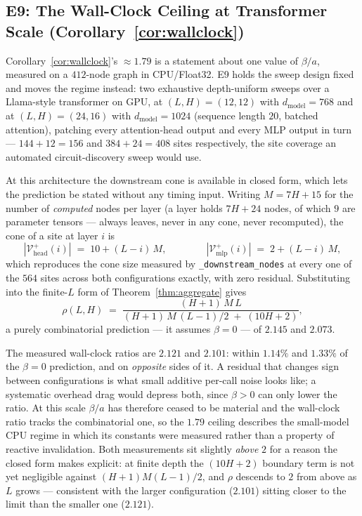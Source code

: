 \documentclass[11pt,a4paper]{article}
\newcommand{\V}{\mathcal{V}}
\begin{document}
\subsection{E9: The Wall-Clock Ceiling at Transformer Scale (Corollary~\ref{cor:wallclock})}
\label{sec:e9}

Corollary~\ref{cor:wallclock}'s $\approx 1.79$ is a statement about one value of $\beta/a$, measured
on a $412$-node graph in CPU\slash Float32. E9 holds the sweep design fixed and moves the regime
instead: two exhaustive depth-uniform sweeps over a Llama-style transformer on GPU, at
$(L,H)=(12,12)$ with $d_{\mathrm{model}}=768$ and at $(L,H)=(24,16)$ with $d_{\mathrm{model}}=1024$
(sequence length $20$, batched attention), patching every attention-head output and every MLP output
in turn --- $144{+}12=156$ and $384{+}24=408$ sites respectively, the site coverage an automated
circuit-discovery sweep would use.

At this architecture the downstream cone is available in closed form, which lets the prediction be
stated without any timing input. Writing $M = 7H+15$ for the number of \emph{computed} nodes per
layer (a layer holds $7H+24$ nodes, of which $9$ are parameter tensors --- always leaves, never in
any cone, never recomputed), the cone of a site at layer $i$ is
\[
|\V^+_{\mathrm{head}}(i)| \;=\; 10 + (L-i)\,M, \qquad\qquad
|\V^+_{\mathrm{mlp}}(i)| \;=\; 2 + (L-i)\,M,
\]
which reproduces the cone size measured by \texttt{\_downstream\_nodes} at every one of the $564$
sites across both configurations exactly, with zero residual. Substituting into the finite-$L$ form
of Theorem~\ref{thm:aggregate} gives
\[
\rho(L,H) \;=\; \frac{(H{+}1)\,M\,L}{(H{+}1)\,M\,(L{-}1)/2 \;+\; (10H{+}2)},
\]
a purely combinatorial prediction --- it assumes $\beta = 0$ --- of $2.145$ and $2.073$.

The measured wall-clock ratios are $2.121$ and $2.101$: within $1.14\%$ and $1.33\%$ of the
$\beta{=}0$ prediction, and on \emph{opposite} sides of it. A residual that changes sign between
configurations is what small additive per-call noise looks like; a systematic overhead drag would
depress both, since $\beta>0$ can only lower the ratio. At this scale $\beta/a$ has therefore ceased
to be material and the wall-clock ratio tracks the combinatorial one, so the $1.79$ ceiling
describes the small-model CPU regime in which its constants were measured rather than a property of
reactive invalidation. Both measurements sit slightly \emph{above} $2$ for a reason the closed form
makes explicit: at finite depth the $(10H{+}2)$ boundary term is not yet negligible against
$(H{+}1)M(L{-}1)/2$, and $\rho$ descends to $2$ from above as $L$ grows --- consistent with the
larger configuration ($2.101$) sitting closer to the limit than the smaller one ($2.121$).
\end{document}
